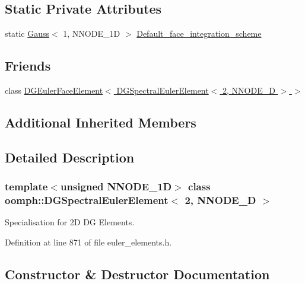\subsection*{Static Private Attributes}
\begin{DoxyCompactItemize}
\item 
static \hyperlink{classoomph_1_1Gauss}{Gauss}$<$ 1, N\+N\+O\+D\+E\+\_\+1D $>$ \hyperlink{classoomph_1_1DGSpectralEulerElement_3_012_00_01NNODE__1D_01_4_a742a01d818fe9787cb564a4a0526c179}{Default\+\_\+face\+\_\+integration\+\_\+scheme}
\end{DoxyCompactItemize}
\subsection*{Friends}
\begin{DoxyCompactItemize}
\item 
class \hyperlink{classoomph_1_1DGSpectralEulerElement_3_012_00_01NNODE__1D_01_4_a4527b362909de61ef243ddd7e1de1771}{D\+G\+Euler\+Face\+Element$<$ D\+G\+Spectral\+Euler\+Element$<$ 2, N\+N\+O\+D\+E\+\_\+D $>$ $>$}
\end{DoxyCompactItemize}
\subsection*{Additional Inherited Members}


\subsection{Detailed Description}
\subsubsection*{template$<$unsigned N\+N\+O\+D\+E\+\_\+1D$>$\newline
class oomph\+::\+D\+G\+Spectral\+Euler\+Element$<$ 2, N\+N\+O\+D\+E\+\_\+D $>$}

Specialisation for 2D DG Elements. 

Definition at line 871 of file euler\+\_\+elements.\+h.



\subsection{Constructor \& Destructor Documentation}
\mbox{\label{classoomph_1_1DGSpectralEulerElement_3_012_00_01NNODE__1D_01_4_a2c43729d163fb8f43d78c546b4c2cc0a}} 
